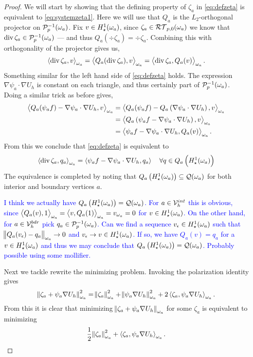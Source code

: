 \documentclass[thesis.tex]{subfiles}
\begin{document}
\begin{proof}
  We will start by showing that the defining property of $\zeta_a$ in \eqref{eq:defzeta} is equivalent to \eqref{eq:systemzeta1}.
  Here we will use that $Q_a$ is the $L_2$-orthogonal projector on $\mathcal{P}_p^{-1}(\omega_a)$.  Fix $v \in H_\star^1(\omega_a)$, 
  since $\zeta_a \in \mathcal{RT}_{p,0}(\omega_a)$ we know that $\operatorname{div} \zeta_a \in \mathcal{P}_p^{-1}(\omega_a)$ --- and thus $Q_a( \div \zeta_a )= \div \zeta_a$.
  Combining this with orthogonality of the projector gives us,
  \[
    \left \langle \operatorname{div} \zeta_a, v \right \rangle_{\omega_a} = \left \langle  Q_a(\operatorname{div} \zeta_a), v \right \rangle_{\omega_a} = \left \langle \operatorname{div} \zeta_a, Q_a(v) \right \rangle_{\omega_a}.
  \]
  Something similar for the left hand side of \eqref{eq:defzeta} holds. The expression $\nabla \psi_a \cdot \nabla U_h$ is constant
  on each triangle, and thus certainly part of $\mathcal{P}_p^{-1}(\omega_a)$. Doing a similar trick as before gives, 
  \begin{align*}
    \left \langle Q_a(\psi_a f) - \nabla \psi_a \cdot \nabla U_h, v \right \rangle_{\omega_a} &= \left \langle Q_a(\psi_a f) - Q_a\left(\nabla \psi_a \cdot \nabla U_h\right),v \right \rangle_{\omega_a}\\
    &= \left \langle Q_a\left(\psi_a f - \nabla \psi_a \cdot \nabla U_h\right), v \right \rangle_{\omega_a}\\
    &= \left \langle \psi_a f - \nabla \psi_a \cdot \nabla U_h, Q_a(v) \right \rangle_{\omega_a}.
  \end{align*}
  From this we conclude that \eqref{eq:defzeta} is equivalent to
  \[
    \left \langle \operatorname{div} \zeta_a, q_a \right \rangle_{\omega_a} = \left \langle \psi_a f - \nabla \psi_a \cdot \nabla U_h, q_a \right \rangle \quad \forall q \in Q_a\left(H_\star^1(\omega_a)\right)
  \]
  The equivalence is completed by  noting that $Q_a\left(H_\star^1(\omega_a)\right) \subseteq \mathcal{Q}(\omega_a)$ for both interior and boundary vertices $a$.

  \textcolor{blue}{
    I think we actually have $Q_a\left(H_\star^1(\omega_a)\right) = \mathcal{Q}(\omega_a)$.
  For $a \in \mathcal{V}_h^{int}$ this is obvious, 
  since $\left \langle Q_a(v), 1 \right \rangle_{\omega_a} = \left \langle v,Q_a(1) \right \rangle_{\omega_a} = v_{\omega_a} = 0$ for $v \in H_\star^1(\omega_a)$.
  On the other hand, for $a \in \mathcal{V}_h^{bdr}$ pick $q_a \in \mathcal{P}_p^{-1}(\omega_a)$.
  Can we find a sequence $v_\epsilon \in H_\star^1(\omega_a)$ such that $\norm{Q_a(v_\epsilon) - q_a}_{\omega_a} \to 0$ 
  and $v_\epsilon \to v \in H_\star^1(\omega_a)$. If so, we have $Q_a(v) = q_a$ for a $v \in H_\star^1(\omega_a)$ and thus we may conclude
  that $Q_a\left(H_\star^1(\omega_a)\right) = \mathcal{Q}(\omega_a)$. Probably possible using some mollifier.  }

  Next we tackle rewrite the minimizing problem. Invoking the polarization identity gives
  \[
    \norm{\zeta_a + \psi_a \nabla U_h}_{\omega_a}^2 = \norm{\zeta_a}_{\omega_a}^2 + \norm{\psi_a \nabla U_h}^2_{\omega_a} + 2 \left \langle \zeta_a, \psi_a \nabla 
    U_h \right \rangle_{\omega_a}.
  \]
  From this it is clear that minimizing $\norm{\zeta_a + \psi_a \nabla U_h}_{\omega_a}$ for some $\zeta_a$ is equivalent to minimizing
  \[
    \frac{1}{2} \norm{\zeta_a}^2_{\omega_a} + \left \langle \zeta_a, \psi_a \nabla U_h \right \rangle_{\omega_a}.
  \]


\end{proof}
\end{document}
